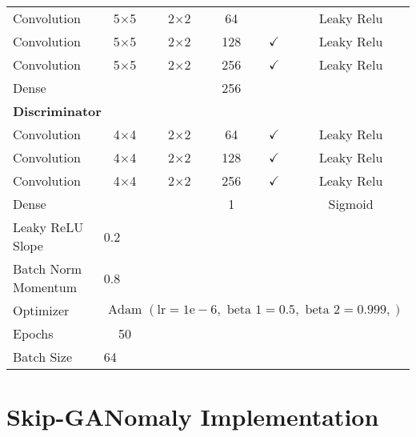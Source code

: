 \begin{longtable}[c]{@{}lccccc@{}}
	Convolution & \multicolumn{1}{c}{5$\times$5} & 2$\times$2 & 64 &  & Leaky Relu \\
	Convolution & \multicolumn{1}{c}{5$\times$5} & 2$\times$2 & 128 & $\checkmark$ & Leaky Relu \\
	Convolution & \multicolumn{1}{c}{5$\times$5} & 2$\times$2 & 256 & $\checkmark$ & Leaky Relu \\
	Dense & \multicolumn{1}{c}{} &  & 256 &  &  \\ 
	\multicolumn{6}{l}{\textbf{Discriminator}} \\
	Convolution & \multicolumn{1}{c}{4$\times$4} & 2$\times$2 & 64 & $\checkmark$ & Leaky Relu \\
	Convolution & \multicolumn{1}{c}{4$\times$4} & 2$\times$2 & 128 & $\checkmark$ & Leaky Relu \\
	Convolution & \multicolumn{1}{c}{4$\times$4} & 2$\times$2 & 256 & $\checkmark$ & Leaky Relu \\
	Dense & \multicolumn{1}{c}{} &  & 1 &  & Sigmoid \\ \hline
	Leaky ReLU Slope & \multicolumn{5}{l}{0.2} \\
	Batch Norm Momentum & \multicolumn{5}{l}{0.8} \\
	Optimizer & \multicolumn{5}{l}{$\text { Adam }(\mathrm{lr}=1 \mathrm{e}-6, \text { beta } 1=0.5, \text { beta } 2=0.999,)$} \\ \hline
	Epochs & 50 & \multicolumn{1}{l}{} & \multicolumn{1}{l}{} & \multicolumn{1}{l}{} & \multicolumn{1}{l}{} \\
	Batch Size & \multicolumn{5}{l}{64}
\end{longtable}


\section{Skip-GANomaly Implementation}

